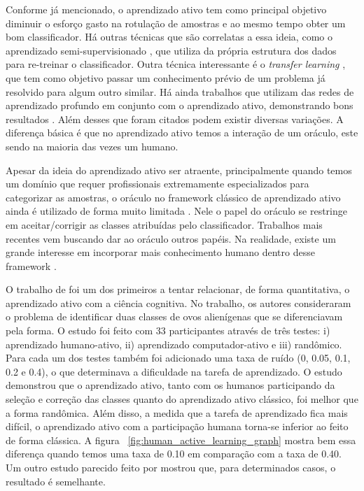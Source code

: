 Conforme já mencionado, o aprendizado ativo tem como principal objetivo diminuir o esforço gasto na rotulação de amostras e ao mesmo tempo obter um bom classificador. Há outras técnicas que são correlatas a essa ideia, como o aprendizado semi-supervisionado \citep{zhu2006semi}, que utiliza da própria estrutura dos dados para re-treinar o classificador. Outra técnica interessante é o \emph{transfer learning} \citep{rodrigues2018evaluation}, que tem como objetivo passar um conhecimento prévio de um problema já resolvido para algum outro similar. Há ainda trabalhos que utilizam das redes de aprendizado profundo em conjunto com o aprendizado ativo, demonstrando bons resultados \citep{bochinski2018deep}. Além desses que foram citados podem existir diversas variações. A diferença básica é que no aprendizado ativo temos a interação de um oráculo, este sendo na maioria das vezes um humano. 


Apesar da ideia do aprendizado ativo ser atraente, principalmente quando temos um domínio que requer profissionais extremamente especializados para categorizar as amostras, o oráculo no framework clássico de aprendizado ativo ainda é utilizado de forma muito limitada \citep{seifert2010user}. Nele o papel do oráculo se restringe em aceitar/corrigir as classes atribuídas pelo classificador. Trabalhos mais recentes vem buscando dar ao oráculo outros papéis. Na realidade, existe um grande interesse em incorporar mais conhecimento humano dentro desse framework \citep{settles2014active}. 

O trabalho de \citep{castro2009human} foi um dos primeiros a tentar relacionar, de forma quantitativa, o aprendizado ativo com a ciência cognitiva. No trabalho, os autores consideraram o problema de identificar duas classes de ovos alienígenas que se diferenciavam pela forma. O estudo foi feito com 33 participantes através de três testes: i) aprendizado humano-ativo, ii) aprendizado computador-ativo e iii) randômico. Para cada um dos testes também foi adicionado uma taxa de ruído (0, 0.05, 0.1, 0.2 e 0.4), o que determinava a dificuldade na tarefa de aprendizado. O estudo demonstrou que o aprendizado ativo, tanto com os humanos participando da seleção e correção das classes quanto do aprendizado ativo clássico, foi melhor que a forma randômica. Além disso, a medida que a tarefa de aprendizado fica mais difícil, o aprendizado ativo com a participação humana torna-se inferior ao feito de forma clássica. A figura ~\ref{fig:human_active_learning_graph} mostra bem essa diferença quando temos uma taxa de 0.10 em comparação com a taxa de 0.40. Um outro estudo parecido feito por \citep{markant2014better} mostrou que, para determinados casos, o resultado é semelhante.

